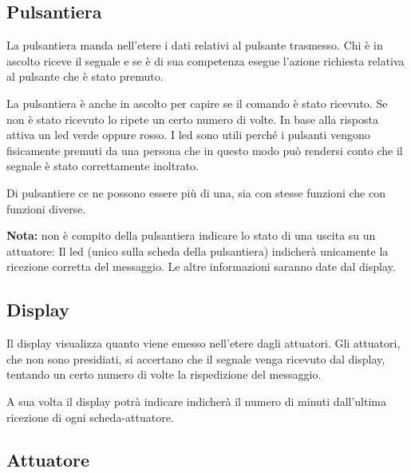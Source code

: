 \documentclass{article}
\begin{document}
	\subsection*{Pulsantiera}
	
	La pulsantiera manda nell'etere i dati relativi al pulsante trasmesso. Chi è in ascolto riceve il segnale e se è di sua competenza esegue l'azione richiesta relativa al pulsante che è stato premuto.
	
	La pulsantiera è anche in ascolto per capire se il comando è stato ricevuto. Se non è stato ricevuto lo ripete un certo numero di volte. In base alla risposta attiva un led verde oppure rosso. I led sono utili perché i pulsanti vengono fisicamente premuti da una persona che in questo modo può rendersi conto che il segnale è stato correttamente inoltrato.
	
	Di pulsantiere ce ne possono essere più di una, sia con stesse funzioni che con funzioni diverse.
	
	\bigskip
	
	\textbf{Nota:} non è compito della pulsantiera indicare lo stato di una uscita su un attuatore: Il led (unico sulla scheda della pulsantiera) indicherà unicamente la ricezione corretta del messaggio. Le altre informazioni saranno date dal display.
	
	\subsection*{Display}
	
	Il display visualizza quanto viene emesso nell'etere dagli attuatori. {\scriptsize Gli attuatori, che non sono presidiati, si accertano che il segnale venga ricevuto dal display, tentando un certo numero di volte la rispedizione del messaggio.}
	
	A sua volta il display potrà indicare indicherà il numero di minuti dall'ultima ricezione di ogni scheda-attuatore.
    
%    
    
    \subsection*{Attuatore}
    
\end{document}
